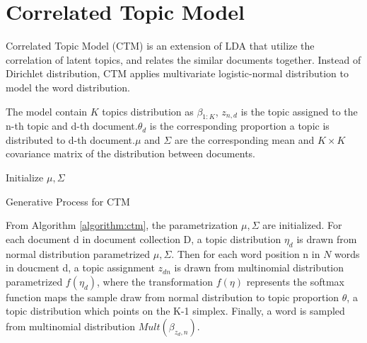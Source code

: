 \section{Correlated Topic Model} \label{ch2:ctm}
Correlated Topic Model (CTM)\cite{blei_correlated_2007} is an extension of LDA\cite{blei_latent_2003} that utilize the correlation of latent topics, and relates the similar documents together. Instead of Dirichlet distribution, CTM applies multivariate logistic-normal distribution to model the word distribution.

The model contain $ K $ topics distribution as $ \beta_{1:K} $, $ z_{n,d} $ is the topic assigned to the n-th topic and d-th document.$ \theta_d $ is the corresponding proportion a topic is distributed to d-th document.$ \mu $ and $ \Sigma $ are the corresponding mean and $ K \times K $ covariance matrix of the distribution between documents.\\
\begin{algorithm}[H]
Initialize $ \mu, \Sigma $\\
\label{algorithm:ctm}
\caption{Generative Process for CTM}
\end{algorithm}
From Algorithm \ref{algorithm:ctm}, the parametrization $ \mu, \Sigma $ are initialized. For each document d in document collection D, a topic distribution $ \eta_d $ is drawn from normal distribution parametrized $ \mu,\Sigma $. Then for each word position n in $ N $ words in doucment d, a topic assignment $ z_{dn} $ is drawn from multinomial distribution parametrized $ f(\eta_d) $, where the transformation $ f(\eta) $ represents the softmax function maps the sample draw from normal distribution to topic proportion $ \theta $, a topic distribution which points on the K-1 simplex. Finally, a word is sampled from multinomial distribution $ Mult(\beta_{z_d,n}) $.
